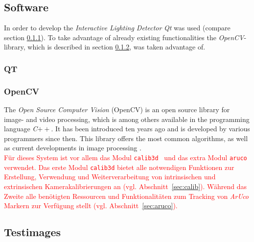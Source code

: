 \subsection{Software} \label{sec:Software}
In order to develop the \textit{Interactive Lighting Detector} \textit{Qt} was used (compare section \ref{sec:qt}). To take advantage of already existing functionalities the \textit{OpenCV}-library, which is described in section \ref{sec:opencv}, was taken advantage of.
\subsubsection{QT} \label{sec:qt}

\subsubsection{OpenCV} \label{sec:opencv}
The \textit{Open Source Computer Vision} (OpenCV) is an open source library for image- and video processing, which is among others available in the programming language \textit{C}$++$. It has been introduced ten years ago and is developed by various programmers since then. This library offers the most common algorithms, as well as current developments in image processing \cite{article:OpenCV}.\\
\textcolor{red}{Für dieses System ist vor allem das Modul \texttt{calib3d}~\cite{website:Calib3dDoc} und das extra Modul \texttt{aruco}~\cite{website:ArucoDoc} verwendet. Das erste Modul \texttt{calib3d}  bietet alle notwendigen Funktionen zur Erstellung, Verwendung und Weiterverarbeitung von intrinsischen und extrinsischen Kamerakalibrierungen an (vgl. Abschnitt~\ref{sec:calib}). Während das Zweite alle benötigten Ressourcen und Funktionalitäten zum Tracking von \textit{ArUco} Markern zur Verfügung stellt (vgl. Abschnitt~\ref{sec:aruco}).}






\subsection{Testimages} \label{sec:testimages}

